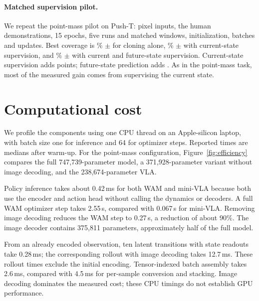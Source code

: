\documentclass[11pt]{article}
\begin{document}
\paragraph{Matched supervision pilot.} We repeat the point-mass pilot on Push-T: pixel inputs, the human demonstrations, 15 epochs, five runs and matched windows, initialization, batches and updates. Best coverage is \PTpilotBc\% $\pm$ \PTpilotBcSd{} for cloning alone, \PTpilotCur\% $\pm$ \PTpilotCurSd{} with current-state supervision, and \PTpilotFut\% $\pm$ \PTpilotFutSd{} with current and future-state supervision. Current-state supervision adds \PTpilotCurMinusBc{} points; future-state prediction adds \PTpilotFutMinusCur. As in the point-mass task, most of the measured gain comes from supervising the current state.

\section{Computational cost}
\label{sec:efficiency}

We profile the components using one CPU thread on an Apple-silicon laptop, with batch size one for inference and 64 for optimizer steps. Reported times are medians after warm-up. For the point-mass configuration, Figure~\ref{fig:efficiency} compares the full 747,739-parameter model, a 371,928-parameter variant without image decoding, and the 238,674-parameter VLA.

Policy inference takes about 0.42\,ms for both WAM and mini-VLA because both use the encoder and action head without calling the dynamics or decoders. A full WAM optimizer step takes 2.55\,s, compared with 0.067\,s for mini-VLA. Removing image decoding reduces the WAM step to 0.27\,s, a reduction of about 90\%. The image decoder contains 375,811 parameters, approximately half of the full model.

From an already encoded observation, ten latent transitions with state readouts take 0.28\,ms; the corresponding rollout with image decoding takes 12.7\,ms. These rollout times exclude the initial encoding. Tensor-indexed batch assembly takes 2.6\,ms, compared with 4.5\,ms for per-sample conversion and stacking. Image decoding dominates the measured cost; these CPU timings do not establish GPU performance.
\end{document}

